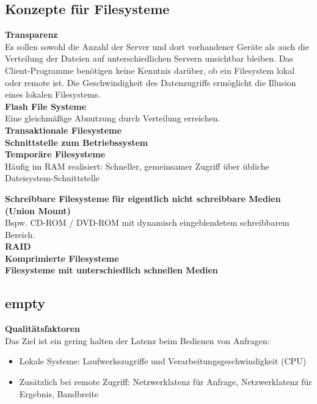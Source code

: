 \documentclass{article} %
\begin{document}
\subsection{Konzepte für Filesysteme}
\noindent\textbf{Transparenz}\\
Es sollen sowohl die Anzahl der Server und dort vorhandener Geräte als auch die Verteilung der Dateien auf unterschiedlichen Servern unsichtbar bleiben. Das Client-Programme benötigen keine Kenntnis darüber, ob ein Filesystem lokal oder remote ist. Die Geschwindigkeit des Datenzugriffs ermöglicht die Illusion eines lokalen Filesystems. \\


\noindent\textbf{Flash File Systeme}\\
Eine gleichmäßige Abnutzung durch Verteilung erreichen.\\

\noindent\textbf{Transaktionale Filesysteme }\\

\noindent\textbf{Schnittstelle zum Betriebssystem}\\

\noindent\textbf{Temporäre Filesysteme }\\
Häufig im RAM realisiert: Schneller, gemeinsamer Zugriff über übliche Dateisystem-Schnittstelle 

\noindent\textbf{Schreibbare Filesysteme für eigentlich nicht schreibbare Medien (Union Mount)}\\
Bspw. CD-ROM / DVD-ROM mit dynamisch eingeblendetem schreibbarem Bereich. \\

\noindent\textbf{RAID}\\

\noindent\textbf{Komprimierte Filesysteme}\\

\noindent\textbf{Filesysteme mit unterschiedlich schnellen Medien}\\

\subsection{empty}
\noindent\textbf{Qualitätsfaktoren}\\
Das Ziel ist ein gering halten der Latenz beim Bedienen von Anfragen:
	\begin{itemize}
	\item Lokale Systeme: Laufwerkszugriffe und Verarbeitungsgeschwindigkeit (CPU)
	\item Zusätzlich bei remote Zugriff: Netzwerklatenz für Anfrage, Netzwerklatenz für Ergebnis, Bandbreite
	\end{itemize}
	
\end{document}
